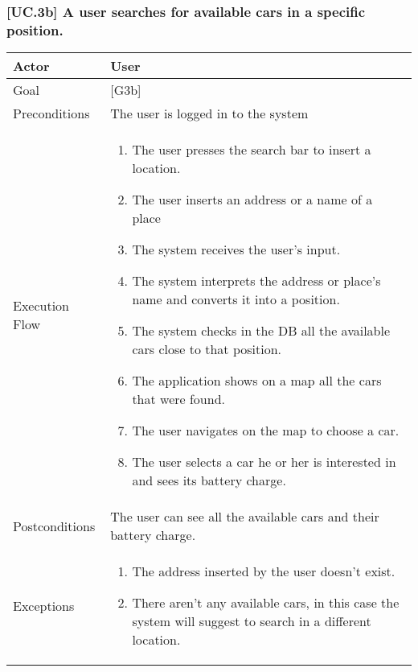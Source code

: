 \documentclass[english]{article}
\begin{document}
	\subsubsection{[UC.3b] A user searches for available cars in a specific position.}
	\begin{tabularx}{\textwidth}{  l  X  }
		\hline
		Actor & User\\
		\hline
		Goal & [G3b]\\
		\hline
		Preconditions & The user is logged in to the system\\
		\hline
		Execution Flow & \begin{enumerate}
			\item{The user presses the search bar to insert a location.}
			\item{The user inserts an address or a name of a place}
			\item{The system receives the user's input.}
			\item{The system interprets the address or place's name and converts it into a position.}
			\item{The system checks in the DB all the available cars close to that position.}
			\item{The application shows on a map all the cars that were found.}
			\item{The user navigates on the map to choose a car.}
			\item{The user selects a car he or her is interested in and sees its battery charge.}
		\end{enumerate}\\
		\hline
		Postconditions & The user can see all the available cars and their battery charge.\\
		\hline
		Exceptions & \begin{enumerate}
			\item{The address inserted by the user doesn't exist.}
			\item{There aren't any available cars, in this case the system will suggest to search in a different location.}
		\end{enumerate}\\
		\hline
	\end{tabularx}
	
\end{document}

